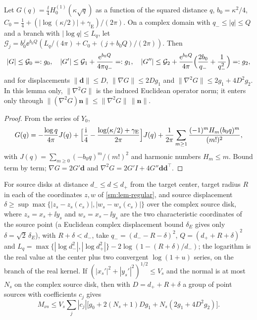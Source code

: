 \begin{lemma}\label{sm:lem-green}
Let $G(q)=\frac\ii4H_0^{(1)}(\kappa\sqrt q)$ as a function of the squared distance
$q$, $b_0=\kappa^2/4$, $C_0=\frac14+(|\log(\kappa/2)|+\gamma_{\mathrm E})/(2\pi)$. On a
complex domain with $q_-\le|q|\le Q$ and a branch with $|\log q|\le L_q$, let
$\mathcal G_j=b_0^j\ee^{b_0Q}(L_q/(4\pi)+C_0+(j+b_0Q)/(2\pi))$. Then
\[
  |G|\le\mathcal G_0=:g_0,\quad
  |G'|\le\mathcal G_1+\frac{\mathrm{e}^{b_0Q}}{4\pi q_-}=:g_1,\quad
  |G''|\le\mathcal G_2+\frac{\mathrm{e}^{b_0Q}}{4\pi}\Bigl(\frac{2b_0}{q_-}+\frac1{q_-^2}\Bigr)=:g_2 ,
\]
and for displacements $\|\boldsymbol d\|\le D$, $\|\nabla G\|\le2Dg_1$ and
$\|\nabla^2G\|\le2g_1+4D^2g_2$. In this lemma only, $\|\nabla^2G\|$ is the induced
Euclidean operator norm; it enters only through $\|(\nabla^2G)\boldsymbol n\|\le
\|\nabla^2G\|\,\|\boldsymbol n\|$.
\end{lemma}

\begin{proof}
From the series of $Y_0$,
\[
  G(q)=-\frac{\log q}{4\pi}J(q)+\Bigl[\frac{\mathrm{i}}4-\frac{\log(\kappa/2)+\gamma_{\mathrm E}}{2\pi}\Bigr]J(q)
  +\frac1{2\pi}\sum_{m\ge1}\frac{(-1)^mH_m(b_0q)^m}{(m!)^2},
\]
with $J(q)=\sum_{m\ge0}(-b_0q)^m/(m!)^2$ and harmonic numbers $H_m\le m$. Bound term by term;
$\nabla G=2G'\boldsymbol d$ and $\nabla^2G=2G'I+4G''\boldsymbol d\boldsymbol d^{\top}$.
\end{proof}

For source disks at distance $d_-\le d\le d_+$ from the target center, target radius
$R$ in each of the coordinates $z,w$ of \cref{sm:lem-regular}, and source displacement
$\delta\ge\sup\max\{|z_s-z_s(c_s)|,|w_s-w_s(c_s)|\}$ over the complex source disk, where
$z_s=x_s+\ii y_s$ and $w_s=x_s-\ii y_s$ are the two characteristic coordinates of the
source point (a Euclidean complex displacement bound $\delta_E$ gives only
$\delta=\sqrt2\,\delta_E$), with $R+\delta<d_-$, take
$q_-=(d_--R-\delta)^2$, $Q=(d_++R+\delta)^2$ and
$L_q=\max\{|\log d_-^2|,|\log d_+^2|\}-2\log(1-(R+\delta)/d_-)$; the logarithm is the
real value at the center plus two convergent $\log(1+u)$ series, on the branch of
the real kernel. If $(|x_s'|^2+|y_s'|^2)^{1/2}\le V_s$ and the normal is at most $N_s$
on the complex source disk,
then with $D=d_++R+\delta$ a group of point sources with coefficients $c_j$ gives
\begin{equation}\label{sm:eq-kernel}
  M_{\nu s}\le V_s\sum_j|c_j|\bigl[g_0+2(N_s+1)Dg_1+N_s(2g_1+4D^2g_2)\bigr].
\end{equation}

